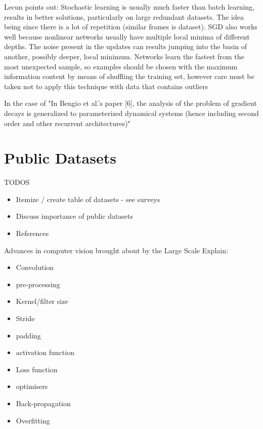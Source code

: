 \cite{lecun2012efficient}
Lecun points out:
Stochastic learning is usually much faster than batch learning, results in better solutions, particularly on large redundant datasets. The idea being since there is a lot of repetition (similar frames is dataset). SGD also works well because nonlinear networks usually have multiple local minima of different depths. The noise present in the updates can results jumping into the basin of another, possibly deeper, local minimum. Networks learn the fastest from the most unexpected sample, so examples should be chosen with the maximum information content by means of shuffling the training set, however care must be taken not to apply this technique with data that contains outliers

In the case of "In Bengio et al.’s paper [6], the analysis of the problem of gradient decays
is generalized to parameterized dynamical systems (hence including second
order and other recurrent architectures)" \cite{hochreiter2001gradient}

\section{Public Datasets}

TODOS

\begin{itemize}
    \item Itemize / create table of datasets - see surveys
    \item Discuss importance of public datasets
    \item References
\end{itemize}

Advances in computer vision brought about by the Large Scale 
Explain:  
\begin{itemize}
    \item Convolution
    \item pre-processing
    \item Kernel/filter size
    \item Stride
    \item padding
    \item activation function
    \item Loss function
    \item optimisers
    \item Back-propagation
    \item Overfitting    
\end{itemize}

